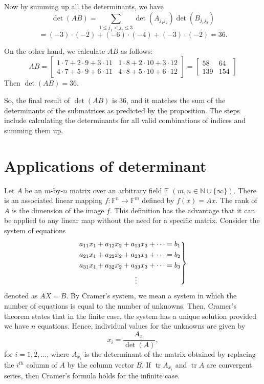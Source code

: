 \begin{example}
Now by summing up all the determinants, we have 
\[
\det(AB) = \sum_{1 \leq j_1 < j_2 \leq 3} \det(A_{j_1j_2}) \det(B_{j_1j_2})
\]
\[
= (-3) \cdot (-2) + (-6) \cdot (-4) + (-3) \cdot (-2) = 36.
\]


On the other hand, we calculate $AB$ as follows:
\[
AB = \begin{bmatrix} 1 \cdot 7 + 2 \cdot 9 + 3 \cdot 11 & 1 \cdot 8 + 2 \cdot 10 + 3 \cdot 12 \\ 4 \cdot 7 + 5 \cdot 9 + 6 \cdot 11 & 4 \cdot 8 + 5 \cdot 10 + 6 \cdot 12 \end{bmatrix}
= \begin{bmatrix} 58 & 64 \\ 139 & 154 \end{bmatrix}
\]
Then $\det(AB)=36$.

So, the final result of \(\det(AB)\) is \(36\), and it matches the sum of the determinants of the submatrices as predicted by the proposition. The steps include calculating the determinants for all valid combinations of indices and summing them up.

\end{example}






\section{Applications of determinant}

Let $A$ be an $m$-by-$n$ matrix over an arbitrary field $\mathbb{F}$ $(m, n \in \mathbb{N} \cup \{\infty\})$. There is an associated linear mapping $f: \mathbb{F}^n \to \mathbb{F}^m$ defined by $f(x) = Ax$. The rank of $A$ is the dimension of the image $f$. This definition has the advantage that it can be applied to any linear map without the need for a specific matrix.
Consider the system of equations
\[
\begin{rcases}
    \begin{aligned}
        &a_{11}x_1 + a_{12}x_2 + a_{13}x_3 + \dots  = b_1 \\
        &a_{21}x_1 + a_{22}x_2 + a_{23}x_3 + \dots  = b_2 \\
        &a_{31}x_1 + a_{32}x_2 + a_{33}x_3 + \dots = b_3 \\
        & \hspace{2.75cm}\vdots\\
    \end{aligned}
\end{rcases}
\]
denoted as $AX = B$. By Cramer's system, we mean a system in which the number of equations is equal to the number of unknowns. Then, Cramer's theorem states that in the finite case, the system has a unique solution provided we have $n$ equations. Hence, individual values for the unknowns are given by
\[
x_i = \frac{A_{x_i}}{\operatorname{det } (A)},
\]
for $i = 1, 2, \dots$, where $A_{x_i}$ is the determinant of the matrix obtained by replacing the $i^{th}$ column of $A$ by the column vector $B$. If $\operatorname{tr } A_{x_i}$ and $\operatorname{tr } A$ are convergent series, then Cramer's formula holds for the infinite case.

